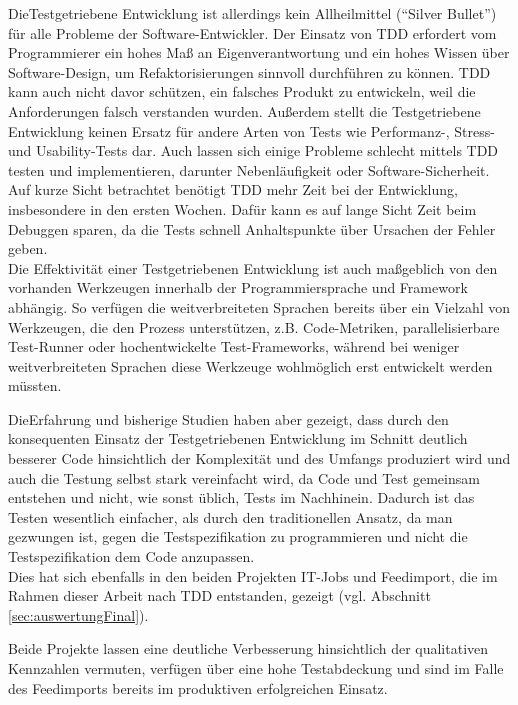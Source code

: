 DieTestgetriebene Entwicklung ist allerdings kein Allheilmittel ("`Silver Bullet"') für alle Probleme der Software-Entwickler. Der Einsatz von TDD erfordert vom Programmierer ein hohes Maß an Eigenverantwortung und ein hohes Wissen über Software-Design, um Refaktorisierungen sinnvoll durchführen zu können. TDD kann auch nicht davor schützen, ein falsches Produkt zu entwickeln, weil die Anforderungen falsch verstanden wurden. Außerdem stellt die Testgetriebene Entwicklung keinen Ersatz für andere Arten von Tests wie Performanz-, Stress- und Usability-Tests dar. Auch lassen sich einige Probleme schlecht mittels TDD testen und implementieren, darunter Nebenläufigkeit oder Software-Sicherheit. Auf kurze Sicht betrachtet benötigt TDD mehr Zeit bei der Entwicklung, insbesondere in den ersten Wochen. Dafür kann es auf lange Sicht Zeit beim Debuggen sparen, da die Tests schnell Anhaltspunkte über Ursachen der Fehler geben.\\
Die Effektivität einer Testgetriebenen Entwicklung ist auch maßgeblich von den vorhanden Werkzeugen innerhalb der Programmiersprache und Framework abhängig. So verfügen die weitverbreiteten Sprachen bereits über ein Vielzahl von Werkzeugen, die den Prozess unterstützen, z.B. Code-Metriken, parallelisierbare Test-Runner oder hochentwickelte Test-Frameworks, während bei weniger weitverbreiteten Sprachen diese Werkzeuge wohlmöglich erst entwickelt werden müssten.

DieErfahrung und bisherige Studien haben aber gezeigt, dass durch den konsequenten Einsatz der Testgetriebenen Entwicklung im Schnitt deutlich besserer Code hinsichtlich der Komplexität und des Umfangs produziert wird und auch die Testung selbst stark vereinfacht wird, da Code und Test gemeinsam entstehen und nicht, wie sonst üblich, Tests im Nachhinein. Dadurch ist das Testen wesentlich einfacher, als durch den traditionellen Ansatz, da man gezwungen ist, gegen die Testspezifikation zu programmieren und nicht die Testspezifikation dem Code anzupassen.\\
Dies hat sich ebenfalls in den beiden Projekten IT-Jobs und Feedimport, die im Rahmen dieser Arbeit nach TDD entstanden, gezeigt (vgl. Abschnitt \ref{sec:auswertungFinal}).

Beide Projekte lassen eine deutliche Verbesserung hinsichtlich der qualitativen Kennzahlen vermuten, verfügen über eine hohe Testabdeckung und sind im Falle des Feedimports bereits im produktiven erfolgreichen Einsatz.

